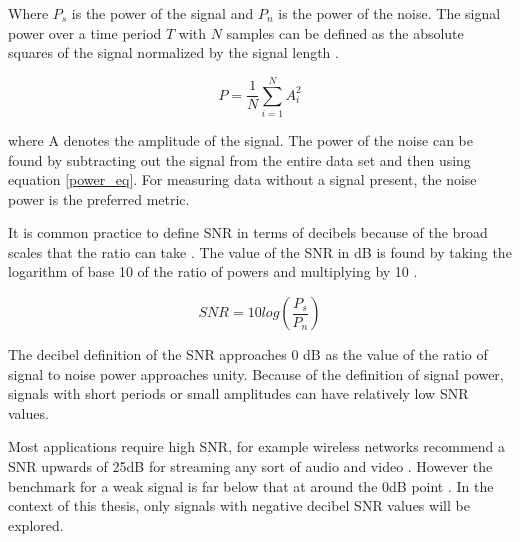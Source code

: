             Where $P_s$ is the power of the signal and $P_n$ is the power of the noise. The signal power over a time period $T$ with $N$ samples can be defined as the absolute squares of the signal normalized by the signal length \cite{de_sousa_battery-resistor_2018}.

            \begin{equation} \label{power_eq}
                P = \frac{1}{N} \sum_{i=1}^{N} A_i^2
            \end{equation}

            where A denotes the amplitude of the signal. The power of the noise can be found by subtracting out the signal from the entire data set and then using equation \ref*{power_eq}. For measuring data without a signal present, the noise power is the preferred metric. 
            
            It is common practice to define SNR in terms of decibels because of the broad scales that the ratio can take \cite{sherman_transducers_2007}. The value of the SNR in dB is found by taking the logarithm of base 10 of the ratio of powers and multiplying by 10 \cite{kassam_robust_1985}.

            \begin{equation} \label{SNR_db_eq}
                SNR = 10log(\frac{P_s}{P_n})
            \end{equation}

            The decibel definition of the SNR approaches 0 dB as the value of the ratio of signal to noise power approaches unity. Because of the definition of signal power, signals with short periods or small amplitudes can have relatively low SNR values. 
            
            Most applications require high SNR, for example wireless networks recommend a SNR upwards of 25dB for streaming any sort of audio and video \cite{cisco_systems_signal--noise_2023}. However the benchmark for a weak signal is far below that at around the 0dB point \cite{wang_current_2013}. In the context of this thesis, only signals with negative decibel SNR values will be explored. 
            
